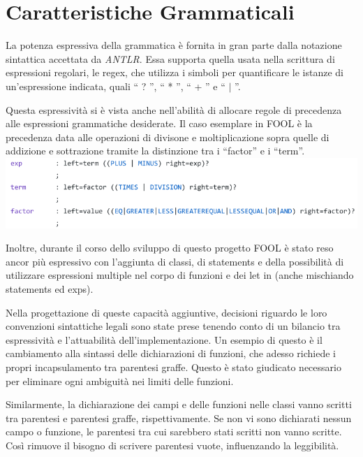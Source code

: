 \documentclass{scrreprt}
\begin{document}
\section{Caratteristiche Grammaticali}

La potenza espressiva della grammatica è fornita in gran parte dalla notazione sintattica accettata da 
\textit{ANTLR}. Essa supporta quella usata nella scrittura di espressioni regolari, le regex, che utilizza i 
simboli per quantificare le istanze di un’espressione indicata, quali `` ? '', `` * '', `` + '' e `` $\mid$ ''. 

Questa espressività si è vista anche nell'abilità di allocare regole di precedenza alle espressioni 
grammatiche desiderate. Il caso esemplare in FOOL è la precedenza data alle operazioni di divisone e 
moltiplicazione sopra quelle di addizione e sottrazione tramite la distinzione tra i ``factor'' e i ``term''. 
\\

\includegraphics[width=\linewidth]{fool_exp_term_factor.png}
 
Inoltre, durante il corso dello sviluppo di questo progetto
FOOL è stato reso ancor più espressivo con l'aggiunta di classi, di statements e della possibilità di utilizzare espressioni multiple nel corpo di funzioni 
e dei let in (anche mischiando statements ed exps). 

Nella progettazione di queste capacità aggiuntive, decisioni riguardo le loro convenzioni sintattiche 
legali sono state prese tenendo conto di un bilancio tra espressività e l'attuabilità 
dell'implementazione. Un esempio di questo è il cambiamento alla sintassi delle dichiarazioni di 
funzioni, che adesso richiede i propri incapsulamento tra parentesi graffe.
Questo è stato giudicato necessario per eliminare ogni ambiguità nei limiti delle funzioni. 

Similarmente, la dichiarazione dei campi e delle funzioni nelle classi vanno scritti tra parentesi e 
parentesi graffe, rispettivamente. Se non vi sono dichiarati nessun campo o funzione, le parentesi tra 
cui sarebbero stati scritti non vanno scritte. Così rimuove il bisogno di scrivere parentesi vuote, 
influenzando la leggibilità. 
\end{document}
